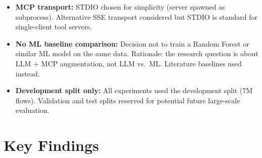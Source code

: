 \documentclass[12pt, a4paper, oneside]{report}
\begin{document}
\begin{itemize}[leftmargin=2em]
  \item \textbf{MCP transport:} STDIO chosen for simplicity (server spawned as
        subprocess). Alternative SSE transport considered but STDIO is standard
        for single-client tool servers.

  \item \textbf{No ML baseline comparison:} Decision not to train a Random Forest
        or similar ML model on the same data. Rationale: the research question is
        about LLM + MCP augmentation, not LLM vs.\ ML. Literature baselines used
        instead.

  \item \textbf{Development split only:} All experiments used the development
        split (7M flows). Validation and test splits reserved for potential
        future large-scale evaluation.
\end{itemize}


\chapter{Key Findings}
\label{ch:findings-notes}
\end{document}
